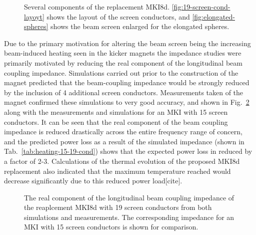 \begin{figure}
\subfigure[]{
\label{fig:19-screen-cond-layout}
}
\subfigure[]{
\label{fig:elongated-spheres}
}
\label{fig:mki8d-points}
\caption{Several components of the replacement MKI8d. \ref{fig:19-screen-cond-layoyt} shows the layout of the screen conductors, and \ref{fig:elongated-spheres} shows the beam screen enlarged for the elongated spheres.}
\end{figure}

Due to the primary motivation for altering the beam screen being the increasing beam-induced heating seen in the kicker magnets the impedance studies were primarily motivated by reducing the real component of the longitudinal beam coupling impedance. Simulations carried out prior to the construction of the magnet predicted that the beam-coupling impedance would be strongly reduced by the inclusion of 4 additional screen conductors. Measurements taken of the magnet  confirmed these simulations to very good accuracy, and shown in Fig.~\ref{fig:mki-19-impedance} along with the measurements and simulations for an MKI with 15 screen conductors. It can be seen that the real component of the beam coupling impedance is reduced drastically across the entire frequency range of concern, and the predicted power loss as a result of the simulated impedance (shown in Tab.~\ref{tab:heating-15-19-cond}) shows that the expected power loss in reduced by a factor of 2-3. Calculations of the thermal evolution of the proposed MKI8d replacement also indicated that the maximum temperature reached would decrease significantly due to this reduced power load[cite]. 

\begin{figure}
\label{fig:mki-19-impedance}
\caption{The real component of the longitudinal beam coupling impedance of the reaplcement MKI8d with 19 screen conductors from both simulations and measurements. The corresponding impedance for an MKI with 15 screen conductors is shown for comparison.}
\end{figure}

